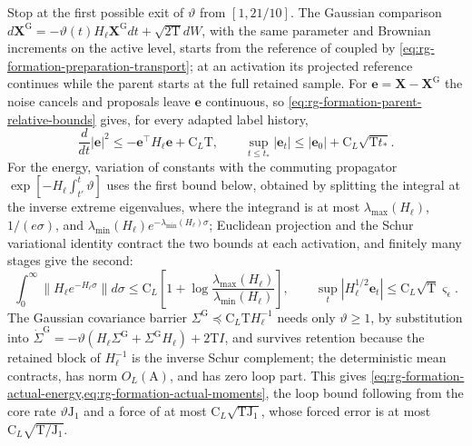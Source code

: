Stop at the first possible exit of \(\vartheta\) from \([1,21/10]\). The
Gaussian comparison
\(d\mathbf X^{\mathrm G}=-\vartheta(t)H_\ell\mathbf X^{\mathrm G}dt
+\sqrt{2\mathrm T} dW\), with the same parameter and Brownian increments on the
active level, starts from the reference of 
coupled by \cref{eq:rg-formation-preparation-transport}; at an activation its
projected reference continues while the parent starts at the full retained
sample. For \(\mathbf e=\mathbf X-\mathbf X^{\mathrm G}\) the noise cancels and
proposals leave \(\mathbf e\) continuous, so
\cref{eq:rg-formation-parent-relative-bounds} gives, for every adapted label
history,
\begin{equation}
 \frac d{dt}|\mathbf e|^2\le-\mathbf e^\top H_\ell\mathbf e+\mathrm C_L\mathrm T,
 \qquad
 \sup_{t\le t_*}|\mathbf e_t|
 \le |\mathbf e_0|+\mathrm C_L\sqrt{\mathrm Tt_*}.
 \label{eq:rg-formation-path-force-bound}
\end{equation}
For the energy, variation of constants with the commuting propagator
\(\exp[-H_\ell\int_{t'}^t\vartheta]\) uses the first bound below, obtained by
splitting the integral at the inverse extreme eigenvalues, where the integrand
is at most \(\lambda_{\max}(H_\ell)\), \(1/(e\sigma)\), and
\(\lambda_{\min}(H_\ell)e^{-\lambda_{\min}(H_\ell)\sigma}\); Euclidean
projection and the Schur variational identity contract the two bounds at each
activation, and finitely many stages give the second:
\begin{equation}
 \int_0^\infty\|H_\ell e^{-H_\ell\sigma}\| d\sigma
 \le \mathrm C_L\left[1+\log
       \frac{\lambda_{\max}(H_\ell)}{\lambda_{\min}(H_\ell)}\right],
 \qquad
 \sup_t|H_\ell^{1/2}\mathbf e_t|\le \mathrm C_L\sqrt{\mathrm T}\varsigma_\epsilon.
 \label{eq:rg-formation-energy-force-bound}
\end{equation}
The Gaussian covariance barrier \(\Sigma^{\mathrm G}\preceq\mathrm C_L\mathrm TH_\ell^{-1}\)
needs only \(\vartheta\ge1\), by substitution into
\(\dot\Sigma^{\mathrm G}=-\vartheta(H_\ell\Sigma^{\mathrm G}+\Sigma^{\mathrm G}H_\ell)
+2\mathrm TI\), and survives retention because the retained block of
\(H_\ell^{-1}\) is the inverse Schur complement; the deterministic mean
contracts, has norm \(O_L(\mathrm A)\), and has zero loop part. This gives
\cref{eq:rg-formation-actual-energy,eq:rg-formation-actual-moments}, the loop
bound following from the core rate \(\vartheta\mathrm J_1\) and a force of at
most \(\mathrm C_L\sqrt{\mathrm T\mathrm J_1}\), whose forced error is at most
\(\mathrm C_L\sqrt{\mathrm T/\mathrm J_1}\).

